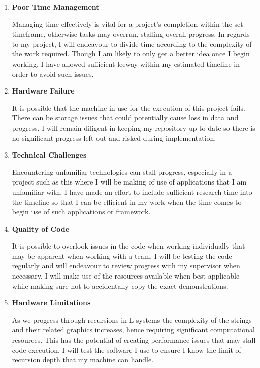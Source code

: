 \documentclass[]{plan}
\begin{document}
\begin{enumerate}
    \item \textsf{\textbf{\large{Poor Time Management}}}
    
    Managing time effectively is vital for a project's completion within the set timeframe, otherwise tasks may overrun, stalling overall progress. In regards to my project, I will endeavour to divide time according to the complexity of the work required. Though I am likely to only get a better idea once I begin working, I have allowed sufficient leeway within my estimated timeline in order to avoid such issues.
    
    \item \textsf{\textbf{\large{Hardware Failure}}}
    
    It is possible that the machine in use for the execution of this project fails. There can be storage issues that could potentially cause loss in data and progress. I will remain diligent in keeping my repository up to date so there is no significant progress left out and risked during implementation.
    
    \item \textsf{\textbf{\large{Technical Challenges}}}
    
    Encountering unfamiliar technologies can stall progress, especially in a project such as this where I will be making of use of applications that I am unfamiliar with. I have made an effort to include sufficient research time into the timeline so that I can be efficient in my work when the time comes to begin use of such applications or framework.
    
    \item \textsf{\textbf{\large{Quality of Code}}}

    It is possible to overlook issues in the code when working individually that may be apparent when working with a team. I will be testing the code regularly and will endeavour to review progress with my supervisor when necessary. I will make use of the resources available when best applicable while making sure not to accidentally copy the exact demonstrations.

    \item \textsf{\textbf{\large{Hardware Limitations}}}

    As we progress through recursions in L-systems the complexity of the strings and their related graphics increases, hence requiring significant computational resources. This has the potential of creating performance issues that may stall code execution. I will test the software I use to ensure I know the limit of recursion depth that my machine can handle.


\end{enumerate}
\end{document}

